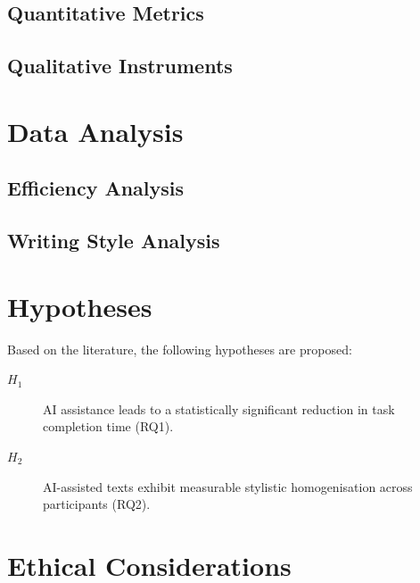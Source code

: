 \subsection{Quantitative Metrics}
\subsection{Qualitative Instruments}

\section{Data Analysis}

\subsection{Efficiency Analysis}
\subsection{Writing Style Analysis}

\section{Hypotheses}

Based on the literature, the following hypotheses are proposed:

\begin{description}
  \item[$H_1$] AI assistance leads to a statistically significant reduction in
    task completion time (RQ1).
  \item[$H_2$] AI-assisted texts exhibit measurable stylistic homogenisation
    across participants (RQ2).
\end{description}

\section{Ethical Considerations}